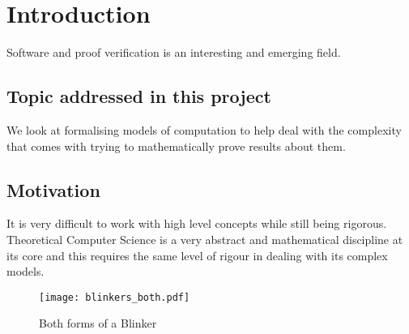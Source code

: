 \chapter{Introduction}

Software and proof verification is an interesting and emerging field.


\section{Topic addressed in this project}

We look at formalising models of computation to help deal with the complexity that comes with trying to mathematically prove results about them.


\section{Motivation}

It is very difficult to work with high level concepts while still being rigorous.
Theoretical Computer Science is a very abstract and mathematical discipline at its core and this requires the same level of rigour in dealing with its complex models.

\begin{figure}[h]
    \centering
    \texttt{[image: blinkers\_both.pdf]}
    \caption{Both forms of a Blinker}
    \label{fig:binkers}
\end{figure}
